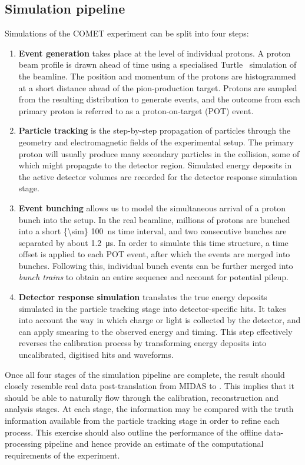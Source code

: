 \subsection{Simulation pipeline}
Simulations of the COMET experiment can be split into four steps:
\begin{enumerate}
    \item {\bf Event generation} takes place at the level of individual protons. A proton beam profile is drawn ahead of time using a specialised Turtle~\cite{Carey1974DecayT} simulation of the beamline. The position and momentum of the protons are histogrammed at a short distance ahead of the pion-production target. Protons are sampled from the resulting distribution to generate events, and the outcome from each primary proton is referred to as a proton-on-target (POT) event.
    \item {\bf Particle tracking} is the step-by-step propagation of particles through the geometry and electromagnetic fields of the experimental setup. The primary proton will usually produce many secondary particles in the collision, some of which might propagate to the detector region. Simulated energy deposits in the active detector volumes are recorded for the detector response simulation stage.
    \item {\bf Event bunching} allows us to model the simultaneous arrival of a proton bunch into the setup. In the real beamline, millions of protons are bunched into a short \SI{{\sim} 100}{\ns} time interval, and two consecutive bunches are separated by about \SI{1.2}{\micro\second}. In order to simulate this time structure, a time offset is applied to each POT event, after which the events are merged into bunches. Following this, individual bunch events can be further merged into \emph{bunch trains} to obtain an entire sequence and account for potential pileup.
    \item {\bf Detector response simulation} translates the true energy deposits simulated in the particle tracking stage into detector-specific hits. It takes into account the way in which charge or light is collected by the detector, and can apply smearing to the observed energy and timing. This step effectively reverses the calibration process by transforming energy deposits into uncalibrated, digitised hits and waveforms.
\end{enumerate}
Once all four stages of the simulation pipeline are complete, the result should closely resemble real data post-translation from MIDAS to \oaEvent. This implies that it should be able to naturally flow through the calibration, reconstruction and analysis stages. At each stage, the information may be compared with the truth information available from the particle tracking stage in order to refine each process. This exercise should also outline the performance of the offline data-processing pipeline and hence provide an estimate of the computational requirements of the experiment.


